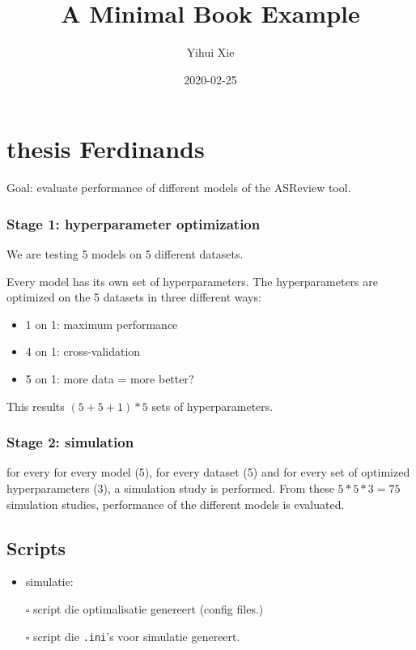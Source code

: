 \documentclass[
]{book}
\title{A Minimal Book Example}
\author{Yihui Xie}
\date{2020-02-25}
\providecommand{\tightlist}{%
  \setlength{\itemsep}{0pt}\setlength{\parskip}{0pt}}
\begin{document}
\maketitle

{
\setcounter{tocdepth}{1}
\tableofcontents
}
\hypertarget{thesis-ferdinands}{%
\chapter{thesis Ferdinands}\label{thesis-ferdinands}}

Goal: evaluate performance of different models of the ASReview tool.

\hypertarget{stage-1-hyperparameter-optimization}{%
\subsection{Stage 1: hyperparameter optimization}\label{stage-1-hyperparameter-optimization}}

We are testing 5 models on 5 different datasets.

Every model has its own set of hyperparameters.
The hyperparameters are optimized on the 5 datasets in three different ways:

\begin{itemize}
\tightlist
\item
  1 on 1: maximum performance
\item
  4 on 1: cross-validation
\item
  5 on 1: more data = more better?
\end{itemize}

This results \((5+5+1)*5\) sets of hyperparameters.

\hypertarget{stage-2-simulation}{%
\subsection{Stage 2: simulation}\label{stage-2-simulation}}

for every for every model (5), for every dataset (5) and for every set of optimized hyperparameters (3), a simulation study is performed. From these \(5*5*3=75\) simulation studies, performance of the different models is evaluated.

\hypertarget{scripts}{%
\section{Scripts}\label{scripts}}

\begin{itemize}
\tightlist
\item
  simulatie:
\item[$\square$]
  script die optimalisatie genereert (config files.)
\item[$\square$]
  script die \texttt{.ini}'s voor simulatie genereert.
\end{itemize}
\end{document}
